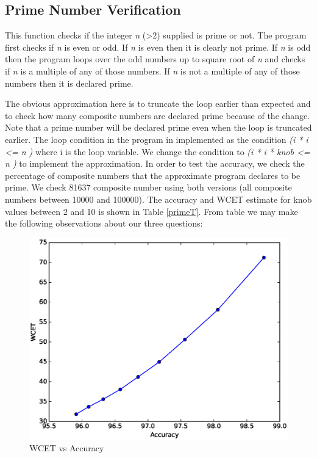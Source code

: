 \subsection{Prime Number Verification}
This function checks if the integer \textit{n} (>2) supplied is prime or not. The program first checks if \textit{n} is even or odd. If \textit{n} is even then it is clearly not prime. If \textit{n} is odd then the program loops over the odd numbers up to square root of \textit{n} and checks if \textit{n} is a multiple of any of those numbers. If \textit{n} is not a multiple of any of those numbers then it is declared prime.

The obvious approximation here is to truncate the loop earlier than expected and to check how many composite numbers are declared prime because of the change. Note that a prime number will be declared prime even when the loop is truncated earlier. The loop condition in the program in implemented as the condition \textit{(i * i <= n )} where i is the loop variable. We change the condition to \textit{(i * i * knob <= n )} to implement the approximation. In order to test the accuracy, we check the percentage of composite numbers that the approximate program declares to be prime. We check 81637 composite number using both versions (all composite numbers between 10000 and 100000). The accuracy and WCET estimate for knob values between 2 and 10 is shown in Table \ref{primeT}. From table we may make the following observations about our three questions:



\begin{figure}
  \includegraphics[width=0.95\linewidth]{Results/prime3.eps}
  \caption{WCET vs Accuracy}
  \label{prime3}
\end{figure}


